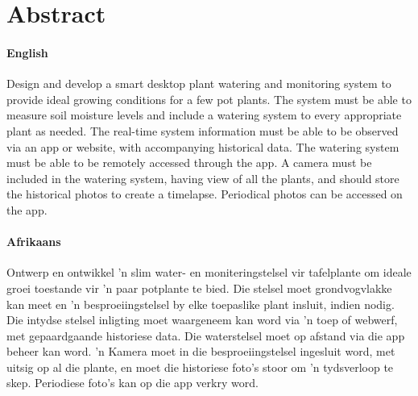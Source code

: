 \chapter*{Abstract}
\makeatletter{}\makeatother

\subsubsection*{English}

Design and develop a smart desktop plant watering and monitoring system to provide ideal growing conditions for a few pot plants. The system must be able to measure soil moisture levels and include a watering system to every appropriate plant as needed. 
The real-time system information must be able to be observed via an app or website, with accompanying historical data. The watering system must be able to be remotely accessed through the app. A camera must be included in the watering system, having view of all the plants, and should store the historical photos to create a timelapse. Periodical photos can be accessed on the app.



\subsubsection*{Afrikaans}

Ontwerp en ontwikkel 'n slim water- en moniteringstelsel vir tafelplante om ideale groei toestande vir 'n paar potplante te bied. Die stelsel moet grondvogvlakke kan meet en 'n besproeiingstelsel by elke toepaslike plant insluit, indien nodig.
Die intydse stelsel inligting moet waargeneem kan word via 'n toep of webwerf, met gepaardgaande historiese data. Die waterstelsel moet op afstand via die app beheer kan word. 'n Kamera moet in die besproeiingstelsel ingesluit word, met uitsig op al die plante, en moet die historiese foto's stoor om 'n tydsverloop te skep. Periodiese foto's kan op die app verkry word.

